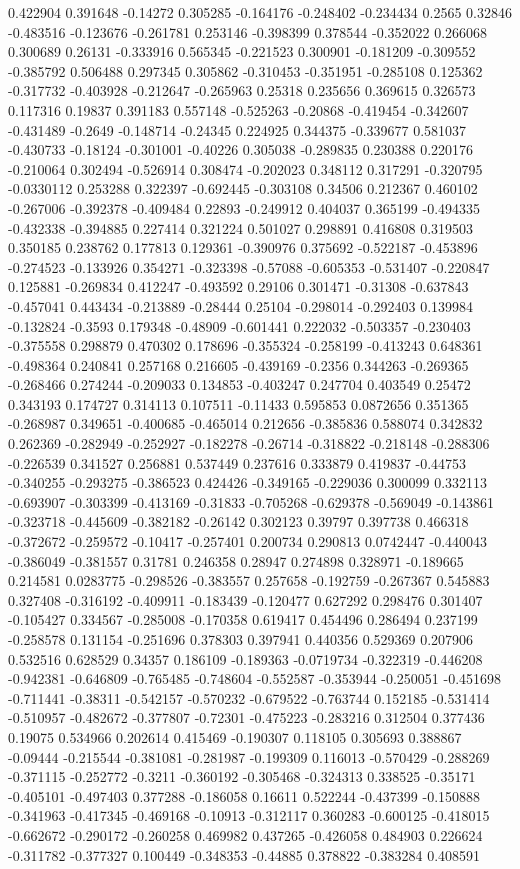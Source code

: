 0.422904 0.391648 -0.14272 0.305285 -0.164176 -0.248402 -0.234434 0.2565 0.32846 -0.483516 -0.123676 -0.261781 0.253146 -0.398399 0.378544 -0.352022 0.266068 0.300689 0.26131 -0.333916 0.565345 -0.221523 0.300901 -0.181209 -0.309552 -0.385792 0.506488 0.297345 0.305862 -0.310453 -0.351951 -0.285108 0.125362 -0.317732 -0.403928 -0.212647 -0.265963 0.25318 0.235656 0.369615 0.326573 0.117316 0.19837 0.391183 0.557148 -0.525263 -0.20868 -0.419454 -0.342607 -0.431489 -0.2649 -0.148714 -0.24345 0.224925 0.344375 -0.339677 0.581037 -0.430733 -0.18124 -0.301001 -0.40226 0.305038 -0.289835 0.230388 0.220176 -0.210064 0.302494 -0.526914 0.308474 -0.202023 0.348112 0.317291 -0.320795 -0.0330112 0.253288 0.322397 -0.692445 -0.303108 0.34506 0.212367 0.460102 -0.267006 -0.392378 -0.409484 0.22893 -0.249912 0.404037 0.365199 -0.494335 -0.432338 -0.394885 0.227414 0.321224 0.501027 0.298891 0.416808 0.319503 0.350185 0.238762 0.177813 0.129361 -0.390976 0.375692 -0.522187 -0.453896 -0.274523 -0.133926 0.354271 -0.323398 -0.57088 -0.605353 -0.531407 -0.220847 0.125881 -0.269834 0.412247 -0.493592 0.29106 0.301471 -0.31308 -0.637843 -0.457041 0.443434 -0.213889 -0.28444 0.25104 -0.298014 -0.292403 0.139984 -0.132824 -0.3593 0.179348 -0.48909 -0.601441 0.222032 -0.503357 -0.230403 -0.375558 0.298879 0.470302 0.178696 -0.355324 -0.258199 -0.413243 0.648361 -0.498364 0.240841 0.257168 0.216605 -0.439169 -0.2356 0.344263 -0.269365 -0.268466 0.274244 -0.209033 0.134853 -0.403247 0.247704 0.403549 0.25472 0.343193 0.174727 0.314113 0.107511 -0.11433 0.595853 0.0872656 0.351365 -0.268987 0.349651 -0.400685 -0.465014 0.212656 -0.385836 0.588074 0.342832 0.262369 -0.282949 -0.252927 -0.182278 -0.26714 -0.318822 -0.218148 -0.288306 -0.226539 0.341527 0.256881 0.537449 0.237616 0.333879 0.419837 -0.44753 -0.340255 -0.293275 -0.386523 0.424426 -0.349165 -0.229036 0.300099 0.332113 -0.693907 -0.303399 -0.413169 -0.31833 -0.705268 -0.629378 -0.569049 -0.143861 -0.323718 -0.445609 -0.382182 -0.26142 0.302123 0.39797 0.397738 0.466318 -0.372672 -0.259572 -0.10417 -0.257401 0.200734 0.290813 0.0742447 -0.440043 -0.386049 -0.381557 0.31781 0.246358 0.28947 0.274898 0.328971 -0.189665 0.214581 0.0283775 -0.298526 -0.383557 0.257658 -0.192759 -0.267367 0.545883 0.327408 -0.316192 -0.409911 -0.183439 -0.120477 0.627292 0.298476 0.301407 -0.105427 0.334567 -0.285008 -0.170358 0.619417 0.454496 0.286494 0.237199 -0.258578 0.131154 -0.251696 0.378303 0.397941 0.440356 0.529369 0.207906 0.532516 0.628529 0.34357 0.186109 -0.189363 -0.0719734 -0.322319 -0.446208 -0.942381 -0.646809 -0.765485 -0.748604 -0.552587 -0.353944 -0.250051 -0.451698 -0.711441 -0.38311 -0.542157 -0.570232 -0.679522 -0.763744 0.152185 -0.531414 -0.510957 -0.482672 -0.377807 -0.72301 -0.475223 -0.283216 0.312504 0.377436 0.19075 0.534966 0.202614 0.415469 -0.190307 0.118105 0.305693 0.388867 -0.09444 -0.215544 -0.381081 -0.281987 -0.199309 0.116013 -0.570429 -0.288269 -0.371115 -0.252772 -0.3211 -0.360192 -0.305468 -0.324313 0.338525 -0.35171 -0.405101 -0.497403 0.377288 -0.186058 0.16611 0.522244 -0.437399 -0.150888 -0.341963 -0.417345 -0.469168 -0.10913 -0.312117 0.360283 -0.600125 -0.418015 -0.662672 -0.290172 -0.260258 0.469982 0.437265 -0.426058 0.484903 0.226624 -0.311782 -0.377327 0.100449 -0.348353 -0.44885 0.378822 -0.383284 0.408591 